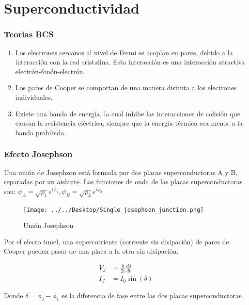 \documentclass[xetex,mathserif,serif, 8pt]{beamer}
\begin{document}
\section{Superconductividad}

\begin{frame}
    \frametitle{Teorías BCS}

    \begin{enumerate}
        \item Los electrones cercanos al nivel de Fermi se acoplan en pares, debido a la interacción con la red cristalina. Esta interacción es una interacción atractiva electrón-fonón-electrón.
        \item Los pares de Cooper se comportan de una manera distinta a los electrones individuales.
        \item Existe una banda de energía, la cual inhibe las interacciones de colisión que causan la resistencia eléctrica, siempre que la energía térmica sea menor a la banda prohibida.
    \end{enumerate}

\end{frame}

\begin{frame}
    \frametitle{Efecto Josephson}

    \justify
    Una unión de Josephson está formada por dos placas superconductoras A y B, separadas por un aislante. Las funciones de onda de las placas superconductoras son: $\psi_A = \sqrt{\rho_1} e^{i \phi_1}, \psi_B = \sqrt{\rho_2} e^{i \phi_2}$

    \begin{figure}[H]
    \centering \texttt{[image: ../../Desktop/Single\_josephson\_junction.png]}
    \caption{Unión Josephson \cite{Miraceti}}
    \label{fig:JJ}
    \end{figure}

    \justify
    Por el efecto tunel, una supercorriente (corriente sin disipación) de pares de Cooper pueden pasar de una placa a la otra sin disipación.

    \begin{align}
        V_J &= \frac{\hbar}{2e} \frac{d\delta}{dt} \\
        I_J &= I_0 \sin(\delta)
    \end{align}

    \justify
    Donde $\delta=\phi_2-\phi_1$ es la diferencia de fase entre las dos placas superconductoras.

\end{frame}
\end{document}
